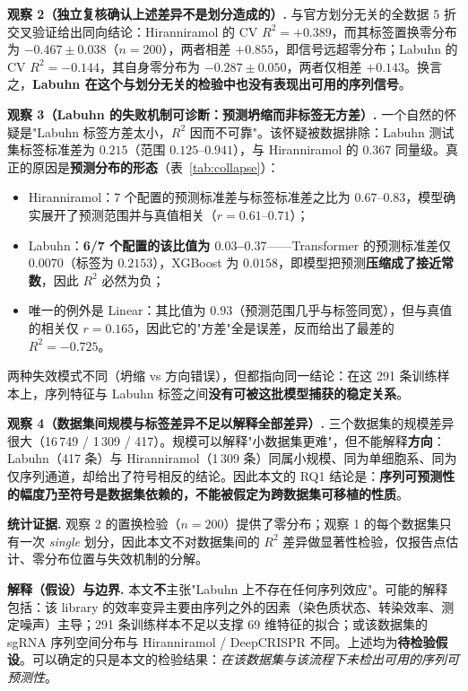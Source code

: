 \textbf{观察 2（独立复核确认上述差异不是划分造成的）.} 与官方划分无关的全数据 5 折交叉验证给出同向结论：Hiranniramol 的 CV $R^{2}=+0.389$，而其标签置换零分布为 $-0.467\pm0.038$（$n=200$），两者相差 $+0.855$，即信号远超零分布；Labuhn 的 CV $R^{2}=-0.144$，其自身零分布为 $-0.287\pm0.050$，两者仅相差 $+0.143$。换言之，\textbf{Labuhn 在这个与划分无关的检验中也没有表现出可用的序列信号}。

\textbf{观察 3（Labuhn 的失败机制可诊断：预测坍缩而非标签无方差）.} 一个自然的怀疑是"Labuhn 标签方差太小，$R^{2}$ 因而不可靠"。该怀疑被数据排除：Labuhn 测试集标签标准差为 $0.215$（范围 $0.125$--$0.941$），与 Hiranniramol 的 $0.367$ 同量级。真正的原因是\textbf{预测分布的形态}（表~\ref{tab:collapse}）：

\begin{itemize}
\item Hiranniramol：7 个配置的预测标准差与标签标准差之比为 $0.67$--$0.83$，模型确实展开了预测范围并与真值相关（$r=0.61$--$0.71$）；
\item Labuhn：\textbf{6/7 个配置的该比值为 $0.03$--$0.37$}——Transformer 的预测标准差仅 $0.0070$（标签为 $0.2153$），XGBoost 为 $0.0158$，即模型把预测\textbf{压缩成了接近常数}，因此 $R^{2}$ 必然为负；
\item 唯一的例外是 Linear：其比值为 $0.93$（预测范围几乎与标签同宽），但与真值的相关仅 $r=0.165$，因此它的"方差"全是误差，反而给出了最差的 $R^{2}=-0.725$。
\end{itemize}

两种失效模式不同（坍缩 vs 方向错误），但都指向同一结论：在这 291 条训练样本上，序列特征与 Labuhn 标签之间\textbf{没有可被这批模型捕获的稳定关系}。

\textbf{观察 4（数据集间规模与标签差异不足以解释全部差异）.} 三个数据集的规模差异很大（16\,749 / 1\,309 / 417）。规模可以解释"小数据集更难"，但不能解释\textbf{方向}：Labuhn（417 条）与 Hiranniramol（1\,309 条）同属小规模、同为单细胞系、同为仅序列通道，却给出了符号相反的结论。因此本文的 RQ1 结论是：\textbf{序列可预测性的幅度乃至符号是数据集依赖的，不能被假定为跨数据集可移植的性质}。

\textbf{统计证据.} 观察 2 的置换检验（$n=200$）提供了零分布；观察 1 的每个数据集只有一次 \emph{single} 划分，因此本文不对数据集间的 $R^{2}$ 差异做显著性检验，仅报告点估计、零分布位置与失效机制的分解。

\textbf{解释（假设）与边界.} 本文\textbf{不}主张"Labuhn 上不存在任何序列效应"。可能的解释包括：该 library 的效率变异主要由序列之外的因素（染色质状态、转染效率、测定噪声）主导；291 条训练样本不足以支撑 69 维特征的拟合；或该数据集的 sgRNA 序列空间分布与 Hiranniramol / DeepCRISPR 不同。上述均为\textbf{待检验假设}。可以确定的只是本文的检验结果：\emph{在该数据集与该流程下未检出可用的序列可预测性}。

